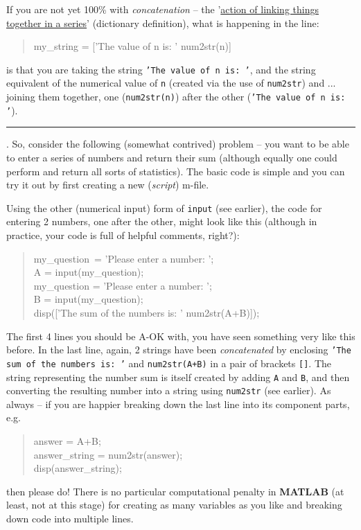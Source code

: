 \documentclass{tufte-book} %
\newenvironment{docspec}{\begin{quotation}\ttfamily\parskip0pt\parindent0pt\ignorespaces}{\end{quotation}}
\begin{document}
If you are not yet 100\% with \textit{concatenation} -- the '\uline{action of linking things together in a series}' (dictionary definition), what is happening in the line: 

\begin{docspec}
my\_string = ['The value of n is: ' num2str(n)]
\end{docspec}

\noindent is that you are taking the string \texttt{'The value of n is: '}, and the string equivalent of the numerical value of \texttt{n} (created via the use of \texttt{num2str}) and ... joining them together, one (\texttt{num2str(n)}) after the other (\texttt{'The value of n is: '}).

\vspace{1mm}
\noindent\rule{4cm}{0.5pt}
\vspace{-2mm}

. So, consider the following (somewhat contrived) problem -- you want to be able to enter a series of numbers and return their sum (although equally one could perform and return all sorts of statistics). The basic code is simple and you can try it out by first creating a new (\textit{script}) \textsf{m-file}.

Using the other (numerical input) form of \texttt{input} (see earlier), the code for entering 2 numbers, one after the other, might look like this (although in practice, your code is full of helpful comments, right?):
\begin{docspec}
my\_question\ = 'Please enter a number: ';
\\A = input(my\_question);
\\my\_question = 'Please enter a number: ';
\\B = input(my\_question);
\\disp(['The sum of the numbers is:  ' num2str(A+B)]);
\end{docspec}

The first 4 lines you should be A-OK with, you have seen something very like this before. In the last line, again, 2 strings have been \textit{concatenated} by enclosing \texttt{'The sum of the numbers is:  '} and \texttt{num2str(A+B)} in a pair of brackets \texttt{[]}. The string representing the number sum is itself created by adding \texttt{A} and \texttt{B}, and then converting the resulting number into a string using \texttt{num2str} (see earlier). As always -- if you are happier breaking down the last line into its component parts, e.g.
\begin{docspec}
answer = A+B;
\\answer\_string = num2str(answer);
\\disp(answer\_string);
\end{docspec}
then please do! There is no particular computational penalty in \textbf{MATLAB} (at least, not at this stage) for creating as many variables as you like and breaking down code into multiple lines.
\end{document}
